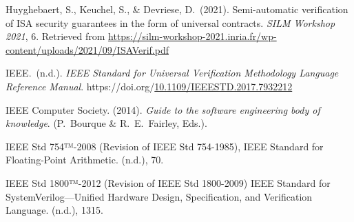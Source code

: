 \documentclass[12pt,twoside]{article}
\begin{document}
{\begin{thebibliography}{1079}
\mdbibitemlabel{}Huyghebaert, S., Keuchel, S., \& Devriese, D.~(2021). Semi-automatic verification of ISA security guarantees in the form of universal contracts. \emph{SILM Workshop 2021}, 6. Retrieved from \href{https://silm-workshop-2021.inria.fr/wp-content/uploads/2021/09/ISAVerif.pdf}{{\ttfamily https://\hspace{0pt}silm-\hspace{0pt}workshop-\hspace{0pt}2021.\hspace{0pt}inria.\hspace{0pt}fr/\hspace{0pt}wp-\hspace{0pt}content/\hspace{0pt}uploads/\hspace{0pt}2021/\hspace{0pt}09/\hspace{0pt}ISAVerif.\hspace{0pt}pdf}}%

\mdbibitemlabel{}IEEE.~(n.d.). \emph{IEEE Standard for Universal Verification Methodology Language Reference Manual}. https://doi.org/\href{https://dx.doi.org/10.1109/IEEESTD.2017.7932212}{10.1109/IEEESTD.2017.7932212}%

\mdbibitemlabel{}IEEE Computer Society. (2014). \emph{Guide to the software engineering body of knowledge}. (P.~Bourque \& R.~E.~Fairley, Eds.).%

\mdbibitemlabel{}IEEE Std 754™-2008 (Revision of IEEE Std 754-1985), IEEE Standard for Floating-Point Arithmetic. (n.d.), 70.%

\mdbibitemlabel{}IEEE Std 1800™-2012 (Revision of IEEE Std 1800-2009) IEEE Standard for SystemVerilog—Unified Hardware Design, Specification, and Verification Language. (n.d.), 1315.%


\end{thebibliography}}
\end{document}
